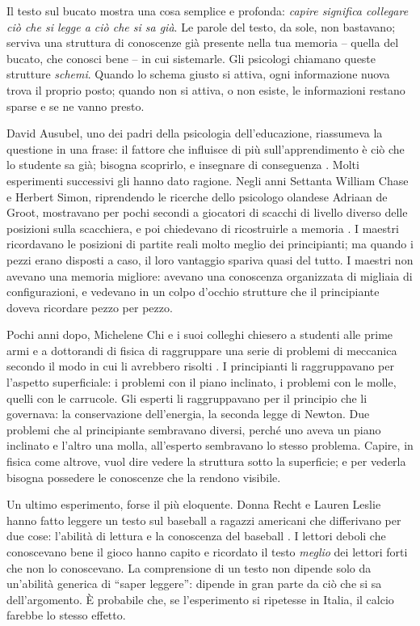 Il testo sul bucato mostra una cosa semplice e profonda: \emph{capire
significa collegare ciò che si legge a ciò che si sa già}. Le parole
del testo, da sole, non bastavano; serviva una struttura di conoscenze
già presente nella tua memoria -- quella del bucato, che conosci bene
-- in cui sistemarle. Gli psicologi chiamano queste strutture
\emph{schemi}. Quando lo schema giusto si attiva, ogni informazione
nuova trova il proprio posto; quando non si attiva, o non esiste, le
informazioni restano sparse e se ne vanno presto.

David Ausubel, uno dei padri della psicologia dell'educazione, riassumeva
la questione in una frase: il fattore che influisce di più
sull'apprendimento è ciò che lo studente sa già; bisogna scoprirlo, e
insegnare di conseguenza \parencite{ausubel1968}. Molti esperimenti
successivi gli hanno dato ragione. Negli anni Settanta William Chase e
Herbert Simon, riprendendo le ricerche dello psicologo olandese Adriaan
de Groot, mostravano per pochi secondi a giocatori di scacchi di
livello diverso delle posizioni sulla scacchiera, e poi chiedevano di
ricostruirle a memoria \parencite{chase1973}. I maestri ricordavano le
posizioni di partite reali molto meglio dei principianti; ma quando i
pezzi erano disposti a caso, il loro vantaggio spariva quasi del tutto.
I maestri non avevano una memoria migliore: avevano una conoscenza
organizzata di migliaia di configurazioni, e vedevano in un colpo
d'occhio strutture che il principiante doveva ricordare pezzo per pezzo.

Pochi anni dopo, Michelene Chi e i suoi colleghi chiesero a studenti
alle prime armi e a dottorandi di fisica di raggruppare una serie di
problemi di meccanica secondo il modo in cui li avrebbero risolti
\parencite{chi1981}. I principianti li raggruppavano per l'aspetto
superficiale: i problemi con il piano inclinato, i problemi con le
molle, quelli con le carrucole. Gli esperti li raggruppavano per il
principio che li governava: la conservazione dell'energia, la seconda
legge di Newton. Due problemi che al principiante sembravano diversi,
perché uno aveva un piano inclinato e l'altro una molla, all'esperto
sembravano lo stesso problema. Capire, in fisica come altrove, vuol
dire vedere la struttura sotto la superficie; e per vederla bisogna
possedere le conoscenze che la rendono visibile.

Un ultimo esperimento, forse il più eloquente. Donna Recht e Lauren
Leslie hanno fatto leggere un testo sul baseball a ragazzi americani
che differivano per due cose: l'abilità di lettura e la conoscenza del
baseball \parencite{recht1988}. I lettori deboli che conoscevano bene il
gioco hanno capito e ricordato il testo \emph{meglio} dei lettori forti
che non lo conoscevano. La comprensione di un testo non dipende solo da
un'abilità generica di \enquote{saper leggere}: dipende in gran parte
da ciò che si sa dell'argomento. È probabile che, se l'esperimento si
ripetesse in Italia, il calcio farebbe lo stesso effetto.

